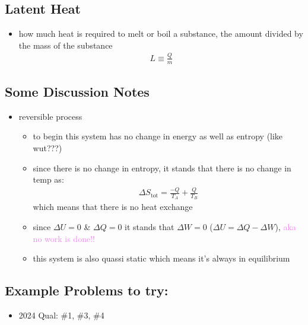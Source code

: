 \subsection{Latent Heat}
\begin{itemize}
	\item how much heat is required to melt or boil a substance, the amount divided by the mass of the substance
	\begin{align}
		L \equiv \frac{Q}{m}
	\end{align}
\end{itemize}

\subsection{Some Discussion Notes}
\begin{itemize}
	\item reversible process
	      \begin{itemize}
		      \item to begin this system has no change in energy as well as entropy (like wut???)
		      \item since there is no change in entropy, it stands that there is no change in temp as:
		            \begin{align}
			            \Delta S_\text{tot} = \frac{-Q}{T_A} + \frac{Q}{T_B}
		            \end{align}
		            which means that there is no heat exchange
		      \item since $\Delta U = 0$ \& $\Delta Q = 0$ it stands that $\Delta W = 0$
		            ($\Delta U = \Delta Q - \Delta W$), \textcolor{violet}{aka no work is done!!}
		      \item this system is also quassi static which means it's always in equilibrium
	      \end{itemize}
\end{itemize}


\subsection{Example Problems to try:}
\begin{itemize}
    \item 2024 Qual: \#1, \#3, \#4
\end{itemize}
